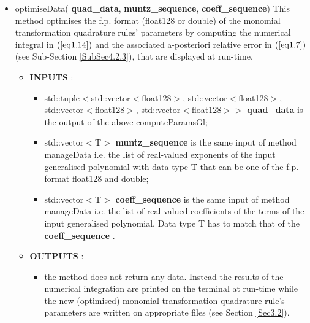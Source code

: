 \documentclass[a4paper, twosided]{book}
\begin{document}
\begin{itemize}
    \item \colorbox{poliGrayBlue}{optimiseData}(\color{poliDarkBlue} \textbf{quad\_data}\color{black}, \color{poliDarkBlue} \textbf{muntz\_sequence}\color{black}, \color{poliDarkBlue} \textbf{coeff\_sequence}\color{black})
    \newline This method optimises the f.p. format (\colorbox{poliGrayBlue}{float128} or \colorbox{poliGrayBlue}{double}) of the 
    monomial transformation quadrature rules' parameters by computing the numerical integral in $(\ref{eq1.14})$ and the associated a-posteriori relative error in $(\ref{eq1.7})$ (see Sub-Section \ref{SubSec4.2.3}), that are displayed at run-time. 
    \begin{itemize}
        \item \color{poliDarkBlue} \textbf{INPUTS} \color{black}:
        \begin{itemize}
            \item \colorbox{poliGrayBlue}{std::tuple$<$std::vector$<$float128$>$, std::vector$<$float128$>$, std::vector$<$float128$>$, std::vector$<$float128$>>$} \color{poliDarkBlue} \textbf{quad\_data} \color{black} is the output of the above \colorbox{poliGrayBlue}{computeParamsGl};
            \item \colorbox{poliGrayBlue}{std::vector$<$T$>$} \color{poliDarkBlue} \textbf{muntz\_sequence} \color{black} is the same input of method \colorbox{poliGrayBlue}{manageData} i.e. the list of real-valued exponents of the input generalised polynomial with data type \colorbox{poliGrayBlue}{T} that can be one of the f.p. format \colorbox{poliGrayBlue}{float128} and \colorbox{poliGrayBlue}{double};
            \item \colorbox{poliGrayBlue}{std::vector$<$T$>$} \color{poliDarkBlue} \textbf{coeff\_sequence} \color{black} is the same input of method \colorbox{poliGrayBlue}{manageData} i.e. the list of real-valued coefficients of the terms of the input generalised polynomial. Data type \colorbox{poliGrayBlue}{T} has to match that of the \color{poliDarkBlue} \textbf{coeff\_sequence} \color{black}.
        \end{itemize}
        \item \color{poliDarkBlue} \textbf{OUTPUTS} \color{black}:
        \begin{itemize}
            \item the method does not return any data. Instead the results of the numerical integration are printed on the terminal at run-time while the new (optimised) monomial transformation quadrature rule's parameters are written on appropriate files (see Section \ref{Sec3.2}).
        \end{itemize}
    \end{itemize}
\end{itemize}
\end{document}
